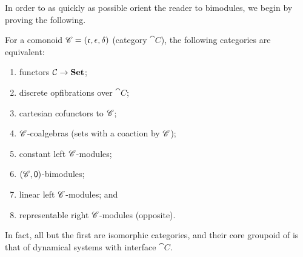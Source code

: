 \documentclass[Book-Poly]{subfiles}
\begin{document}
In order to as quickly as possible orient the reader to bimodules, we begin by proving the following.

\begin{theorem}\label{thm.tfae_c_sets}
For a comonoid $\mathscr{C}=(\mathfrak{c},\epsilon,\delta)$ (category $\cat{C}$), the following categories are equivalent:
\begin{enumerate}
	\item functors $\mathcal{C}\to\mathbf{Set}$;
	\item discrete opfibrations over $\cat{C}$;
	\item cartesian cofunctors to $\mathscr{C}$;
	\item $\mathscr{C}$-coalgebras (sets with a coaction by $\mathscr{C}$);
	\item constant left $\mathscr{C}$-modules;
	\item $(\mathscr{C},\textsf{0})$-bimodules;
	\item linear left $\mathscr{C}$-modules; and
	\item representable right $\mathscr{C}$-modules (opposite).
\end{enumerate}
In fact, all but the first are isomorphic categories, and their core groupoid of is that of dynamical systems with interface $\cat{C}$.
\end{theorem}
\end{document}
